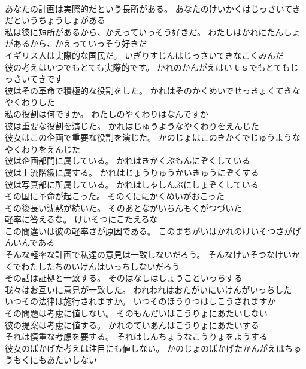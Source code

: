\documentclass[8pt]{extreport}
\begin{document}
\begin{CJK}{UTF8}{min}
\\	あなたの計画は実際的だという長所がある。	あなたのけいかくはじっさいてきだというちょうしょがある 
\\	私は彼に短所があるから、かえっていっそう好きだ。	わたしはかれにたんしょがあるから、かえっていっそう好きだ 
\\	イギリス人は実際的な国民だ。	いぎりすじんはじっさいてきなこくみんだ 
\\	彼の考えはいつでもとても実際的です。	かれのかんがえはいｔｓでもとてもじっさいてきです 
\\	彼はその革命で積極的な役割をした。	かれはそのかくめいでせっきょくてきなやくわりした 
\\	私の役割は何ですか。	わたしのやくわりはなんですか 
\\	彼は重要な役割を演じた。	かれはじゅうようなやくわりをえんじた 
\\	彼女はこの企画で重要な役割を演じた。	かのじょはこのきかくでじゅうようなやくわりをえんじた 
\\	彼は企画部門に属している。	かれはきかくぶもんにぞくしている 
\\	彼は上流階級に属する。	かれはじょうりゅうかいきゅうにぞくする 
\\	彼は写真部に所属している。	かれはしゃしんぶにしょぞくしている 
\\	その国に革命が起こった。	そのくににかくめいがおこった 
\\	その後長い沈黙が続いた。	そのあとながいちんもくがつづいた 
\\	軽率に答えるな。	けいそつにこたえるな 
\\	この間違いは彼の軽率さが原因である。	このまちがいはかれのけいそつさがげんいんである 
\\	そんな軽率な計画で私達の意見は一致しないだろう。	そんなけいそつなけいかくでわたしたちのいけんはいっちしないだろう 
\\	その話は証拠と一致する。	そのはなしはしょうこといっちする 
\\	我々はお互いに意見が一致した。	われわれはおたがいにいけんがいっちした 
\\	いつその法律は施行されますか。	いつそのほうりつはしこうされますか 
\\	その問題は考慮に値しない。	そのもんだいはこうりょにあたいしない 
\\	彼の提案は考慮に値する。	かれのていあんはこうりょにあたいする 
\\	それは慎重な考慮を要する。	それはしんちょうなこうりょをようする 
\\	彼女のばかげた考えは注目にも値しない。	かのじょのばかげたかんがえはちゅうもくにもあたいしない 

\end{CJK}
\end{document}

